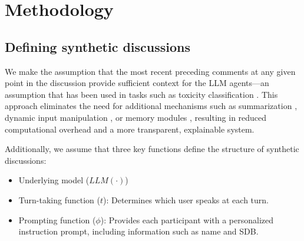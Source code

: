 %

\section{Methodology}
\label{sec:methodology}

\subsection{Defining synthetic discussions}
\label{ssec:methodology:discussions}



We make the assumption that the most recent preceding comments at any given point in the discussion provide sufficient context for the \ac{LLM} agents—an assumption that has been used in tasks such as toxicity classification \cite{pavlopoulos_2020_toxicity}. This approach eliminates the need for additional mechanisms such as summarization \cite{balog_2024}, dynamic input manipulation \cite{yu_2024_fincon}, or memory modules \cite{Vezhnevets2023GenerativeAM}, resulting in reduced computational overhead and a more transparent, explainable system.

Additionally, we assume that three key functions define the structure of synthetic discussions:
\begin{itemize}[nosep, noitemsep]
    \item Underlying model ($LLM(\cdot)$)
    \item Turn-taking function ($t$): Determines which user speaks at each turn.
    \item Prompting function ($\phi$): Provides each participant with a personalized instruction prompt, including information such as name and \ac{SDB}.
\end{itemize}

